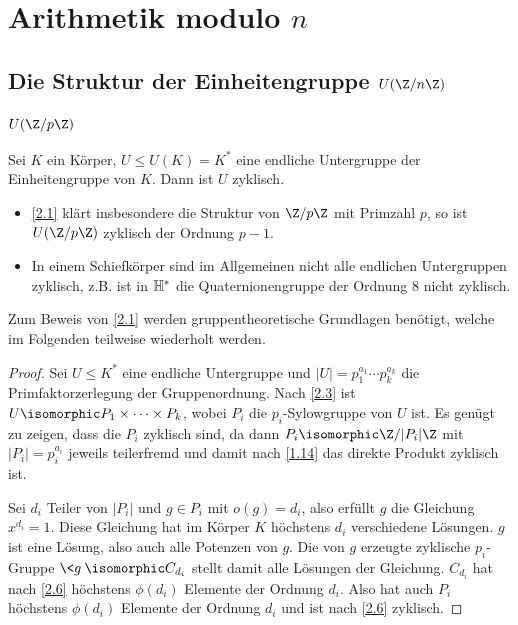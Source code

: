 \chapter{Arithmetik modulo \texorpdfstring{$n$}{n}}



\section{Die Struktur der Einheitengruppe \texorpdfstring{$U(\Z / n\Z)$}{U(ℤ/nℤ)}}


\subsection{\texorpdfstring{$U(\Z / p\Z)$}{U(ℤ/pℤ)}}


\begin{st} \label{2.1}
	Sei $K$ ein Körper, $U \le U(K) = K^*$ eine endliche Untergruppe der Einheitengruppe von $K$.
	Dann ist $U$ zyklisch.
	\begin{note}
		\begin{itemize}
			\item
				\ref{2.1} klärt insbesondere die Struktur von $\Z / p\Z$ mit Primzahl $p$, so ist $U(\Z / p\Z)$ zyklisch der Ordnung $p - 1$.
			\item
				In einem Schiefkörper sind im Allgemeinen nicht alle endlichen Untergruppen zyklisch, z.B. ist in $\mathbb{H}^*$ die Quaternionengruppe der Ordnung $8$ nicht zyklisch.
		\end{itemize}
		Zum Beweis von \ref{2.1} werden gruppentheoretische Grundlagen benötigt, welche im Folgenden teilweise wiederholt werden.
	\end{note}
	\begin{proof}
		Sei $U \le K^*$ eine endliche Untergruppe und $|U| = p_1^{a_1} \dotsb p_k^{a_k}$ die Primfaktorzerlegung der Gruppenordnung.
		Nach \ref{2.3} ist $U \isomorphic P_1 \times \dotsb \times P_k$, wobei $P_i$ die $p_i$-Sylowgruppe von $U$ ist.
		Es genügt zu zeigen, dass die $P_i$ zyklisch sind, da dann $P_i \isomorphic \Z / |P_i| \Z$ mit $|P_i| = p_i^{a_i}$ jeweils teilerfremd und damit nach \ref{1.14} das direkte Produkt zyklisch ist.

		Sei $d_i$ Teiler von $|P_i|$ und $g \in P_i$ mit $o(g) = d_i$, also erfüllt $g$ die Gleichung $x^{d_i} = 1$.
		Diese Gleichung hat im Körper $K$ höchstens $d_i$ verschiedene Lösungen.
		$g$ ist eine Lösung, also auch alle Potenzen von $g$.
		Die von $g$ erzeugte zyklische $p_i$-Gruppe $\<g\> \isomorphic C_{d_i}$ stellt damit alle Lösungen der Gleichung.
		$C_{d_i}$ hat nach \ref{2.6} höchstens $\phi(d_i)$ Elemente der Ordnung $d_i$.
		Also hat auch $P_i$ höchstens $\phi(d_i)$ Elemente der Ordnung $d_i$ und ist nach \ref{2.6} zyklisch.
	\end{proof}
\end{st}

